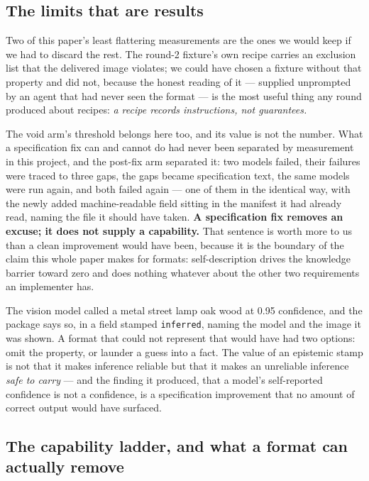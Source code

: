 \documentclass[10pt,twocolumn,letterpaper]{article}
\newcommand{\code}[1]{\texttt{\small #1}}
\begin{document}
\subsection{The limits that are results}

Two of this paper's least flattering measurements are the ones we would keep if we had to discard the rest. The round-2 fixture's own recipe carries an exclusion list that the delivered image violates; we could have chosen a fixture without that property and did not, because the honest reading of it --- supplied unprompted by an agent that had never seen the format --- is the most useful thing any round produced about recipes: \emph{a recipe records instructions, not guarantees.}

The void arm's threshold belongs here too, and its value is not the number. What a specification fix can and cannot do had never been separated by measurement in this project, and the post-fix arm separated it: two models failed, their failures were traced to three gaps, the gaps became specification text, the same models were run again, and both failed again --- one of them in the identical way, with the newly added machine-readable field sitting in the manifest it had already read, naming the file it should have taken. \textbf{A specification fix removes an excuse; it does not supply a capability.} That sentence is worth more to us than a clean improvement would have been, because it is the boundary of the claim this whole paper makes for formats: self-description drives the knowledge barrier toward zero and does nothing whatever about the other two requirements an implementer has.

The vision model called a metal street lamp oak wood at 0.95 confidence, and the package says so, in a field stamped \code{inferred}, naming the model and the image it was shown. A format that could not represent that would have had two options: omit the property, or launder a guess into a fact. The value of an epistemic stamp is not that it makes inference reliable but that it makes an unreliable inference \emph{safe to carry} --- and the finding it produced, that a model's self-reported confidence is not a confidence, is a specification improvement that no amount of correct output would have surfaced.

\subsection{The capability ladder, and what a format can actually remove}
\end{document}
